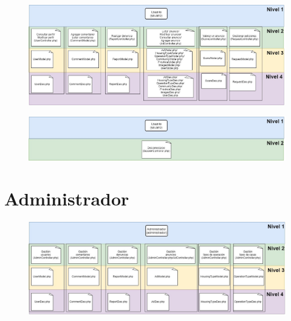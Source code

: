 \begin{figure}[h]
\centering
\includegraphics[width=1\textwidth]{Img/Disenyo/upohouse_dint_usuario_01.jpg}
\end{figure}
\begin{figure}[h]
\centering
\includegraphics[width=1\textwidth]{Img/Disenyo/upohouse_dint_usuario_02.jpg}
\end{figure}

\section{Administrador}

\begin{figure}[h!]
\centering
\includegraphics[width=1\textwidth]{Img/Disenyo/upohouse_dint_administrador.jpg}
\label{fig:dcu}
\end{figure}
